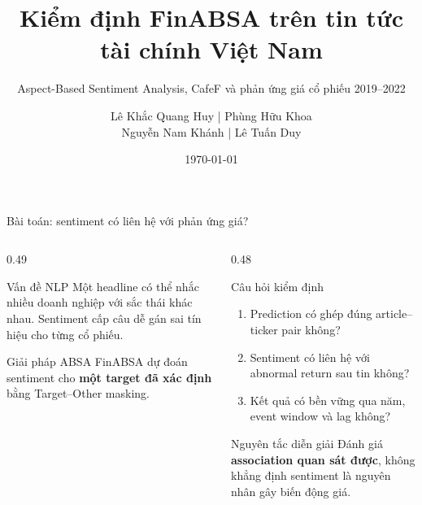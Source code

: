 \documentclass[10pt,aspectratio=169]{beamer}
\title[FinABSA--CafeF]{Kiểm định FinABSA trên tin tức tài chính Việt Nam}
\subtitle{Aspect-Based Sentiment Analysis, CafeF và phản ứng giá cổ phiếu 2019--2022}
\author{\small Lê Khắc Quang Huy \quad | \quad Phùng Hữu Khoa \\[0.12cm]
\small Nguyễn Nam Khánh \quad | \quad Lê Tuấn Duy}
\institute{Natural Language Processing}
\date{\today}
\newcommand{\highlight}[1]{\textcolor{FinBlue}{\textbf{#1}}}
\begin{document}
\begin{frame}
\titlepage
\end{frame}

\begin{frame}{Bài toán: sentiment có liên hệ với phản ứng giá?}
\begin{columns}[T,onlytextwidth]
\begin{column}{0.49\textwidth}
\begin{block}{Vấn đề NLP}
Một headline có thể nhắc nhiều doanh nghiệp với sắc thái khác nhau. Sentiment cấp câu dễ gán sai tín hiệu cho từng cổ phiếu.
\end{block}
\begin{block}{Giải pháp ABSA}
FinABSA dự đoán sentiment cho \highlight{một target đã xác định} bằng Target--Other masking.
\end{block}
\end{column}
\begin{column}{0.48\textwidth}
\begin{block}{Câu hỏi kiểm định}
\begin{enumerate}
\item Prediction có ghép đúng article--ticker pair không?
\item Sentiment có liên hệ với abnormal return sau tin không?
\item Kết quả có bền vững qua năm, event window và lag không?
\end{enumerate}
\end{block}
\begin{alertblock}{Nguyên tắc diễn giải}
Đánh giá \textbf{association quan sát được}, không khẳng định sentiment là nguyên nhân gây biến động giá.
\end{alertblock}
\end{column}
\end{columns}
\end{frame}
\end{document}
